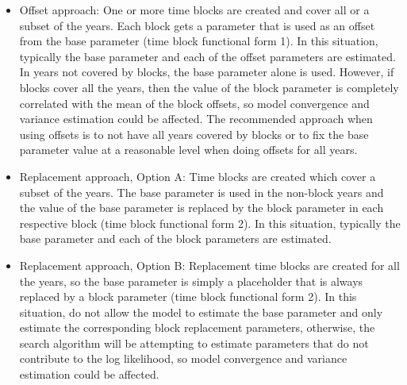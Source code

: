 \begin{itemize}
	\item Offset approach: One or more time blocks are created and cover all or a subset of the years. Each block gets a parameter that is used as an offset from the base parameter (time block functional form 1). In this situation, typically the base parameter and each of the offset parameters are estimated. In years not covered by blocks, the base parameter alone is used. However, if blocks cover all the years, then the value of the block parameter is completely correlated with the mean of the block offsets, so model convergence and variance estimation could be affected. The recommended approach when using offsets is to not have all years covered by blocks or to fix the base parameter value at a reasonable level when doing offsets for all years.	
	
	\item Replacement approach, Option A: Time blocks are created which cover a subset of the years. The base parameter is used in the non-block years and the value of the base parameter is replaced by the block parameter in each respective block (time block functional form 2). In this situation, typically the base parameter and each of the block parameters are estimated.	
	
	\item Replacement approach, Option B: Replacement time blocks are created for all the years, so the base parameter is simply a placeholder that is always replaced by a block parameter (time block functional form 2). In this situation, do not allow the model to estimate the base parameter and only estimate the corresponding block replacement parameters, otherwise, the search algorithm will be attempting to estimate parameters that do not contribute to the log likelihood, so model convergence and variance estimation could be affected.
\end{itemize}


